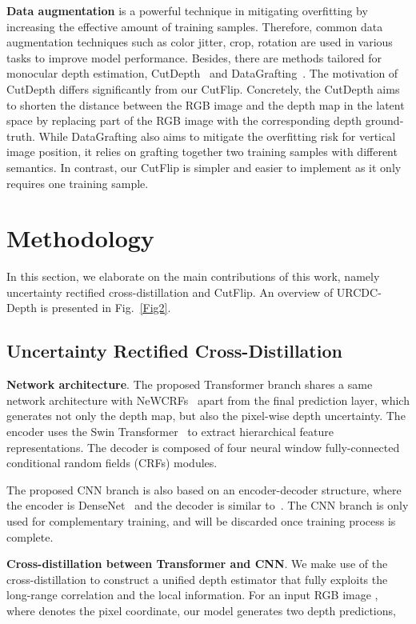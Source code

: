 \documentclass[letterpaper]{article} \usepackage{aaai23}  \usepackage{times}  \usepackage{helvet}  \usepackage{courier}  \usepackage[hyphens]{url}  \usepackage{graphicx} \urlstyle{rm} \def\UrlFont{\rm}  \usepackage{natbib}  \usepackage{caption} \frenchspacing  \setlength{\pdfpagewidth}{8.5in} \setlength{\pdfpageheight}{11in} \usepackage{algorithm}
\begin{document}
\textbf{Data augmentation} is a powerful technique in mitigating overfitting by increasing the effective amount of training samples. Therefore, common data augmentation techniques such as color jitter, crop, rotation are used in various tasks to improve model performance. Besides, there are methods tailored for monocular depth estimation, CutDepth~\cite{ishii2021cutdepth} and DataGrafting~\cite{Peng_2021_ICCV}. The motivation of CutDepth differs significantly from our CutFlip. Concretely, the CutDepth aims to shorten the distance between the RGB image and the depth map in the latent space by replacing part of the RGB image with the corresponding depth ground-truth. While DataGrafting also aims to mitigate the overfitting risk for vertical image position, it relies on grafting together two training samples with different semantics. In contrast, our CutFlip is simpler and easier to implement as it only requires one training sample. 


\section{Methodology}
In this section, we elaborate on the main contributions of this work, namely uncertainty rectified cross-distillation and CutFlip. An overview of URCDC-Depth is presented in Fig.~\ref{Fig2}.
\subsection{Uncertainty Rectified Cross-Distillation}

\textbf{Network architecture}. The proposed Transformer branch shares a same network architecture with NeWCRFs~\cite{Yuan_2022_CVPR} apart from the final prediction layer, which generates not only the depth map, but also the pixel-wise depth uncertainty. The encoder uses the Swin Transformer~\cite{Liu_2021_ICCV} to extract hierarchical feature representations. The decoder is composed of four neural window fully-connected conditional random fields (CRFs) modules.

The proposed CNN branch is also based on an encoder-decoder structure, where the encoder is DenseNet~\cite{huang2017densely} and the decoder is similar to~\cite{kim2022global}. The CNN branch is only used for complementary training, and will be discarded once training process is complete.

\textbf{Cross-distillation between Transformer and CNN}. We make use of the cross-distillation to construct a unified depth estimator that fully exploits the long-range correlation and the local information. For an input RGB image , where  denotes the pixel coordinate, our model generates two depth predictions,
\end{document}
